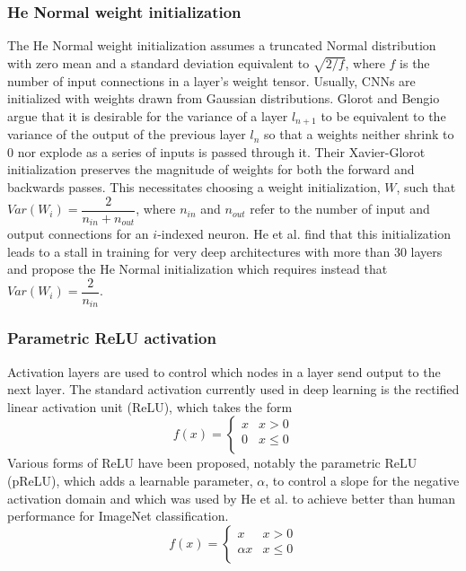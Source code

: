 \subsubsection{He Normal weight initialization}
The He Normal weight initialization assumes a truncated Normal distribution with zero mean and a standard deviation equivalent to $\sqrt{2 / f}$, where $f$ is the number of input connections in a layer's weight tensor. Usually, CNNs are initialized with weights drawn from Gaussian distributions. Glorot and Bengio argue that it is desirable for the variance of a layer $l_{n+1}$ to be equivalent to the variance of the output of the previous layer $l_{n}$ so that a weights neither shrink to 0 nor explode as a series of inputs is passed through it.\cite{glorot2010understanding} Their Xavier-Glorot initialization preserves the magnitude of weights for both the forward and backwards passes. This necessitates choosing a weight initialization, $W$, such that $Var(W_i) = \dfrac{2}{n_{in}+n_{out}}$, where $n_{in}$ and $n_{out}$ refer to the number of input and output connections for an $i$-indexed neuron. He et al. find that this initialization leads to a stall in training for very deep architectures with more than 30 layers and propose the He Normal initialization which requires instead that $Var(W_i) = \dfrac{2}{n_{in}}$.\cite{he2015delving}

\subsubsection{Parametric ReLU activation}
Activation layers are used to control which nodes in a layer send output to the next layer. The standard activation currently used in deep learning is the rectified linear activation unit (ReLU), which takes the form
\begin{equation}
f(x) = \begin{cases}
x & x > 0 \\
0 & x\leq 0 \\
\end{cases}
\end{equation}
Various forms of ReLU have been proposed, notably the parametric ReLU (pReLU), which adds a learnable parameter, $\alpha$, to control a slope for the negative activation domain and which was used by He et al. to achieve better than human performance for ImageNet classification.\cite{he2016deep}
\begin{equation}
f(x) = \begin{cases}
x & x > 0 \\
\alpha x & x \leq 0 \\
\end{cases}
\end{equation} 

